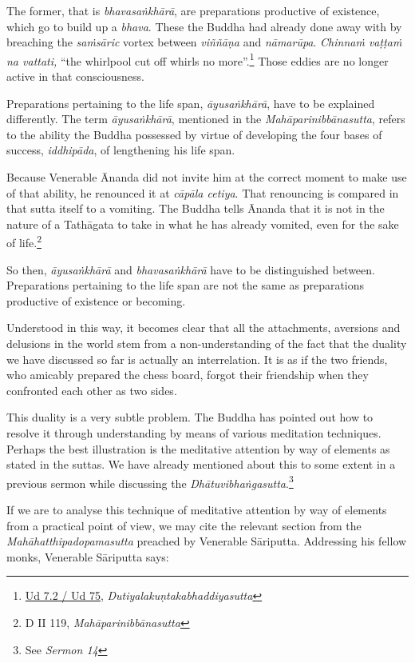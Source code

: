 The former, that is \emph{bhavasaṅkhārā}, are preparations productive of existence, which go to build up a \emph{bhava}. These the Buddha had already done away with by breaching the \emph{saṁsāric} vortex between \emph{viññāṇa} and \emph{nāmarūpa}. \emph{Chinnaṁ vaṭṭaṁ na vattati,} ``the whirlpool cut off whirls no more''.\footnote{\href{https://suttacentral.net/ud7.2/pli/ms}{Ud 7.2 / Ud 75}, \emph{Dutiyalakuṇtakabhaddiyasutta}} Those eddies are no longer active in that consciousness.

Preparations pertaining to the life span, \emph{āyusaṅkhārā}, have to be explained differently. The term \emph{āyusaṅkhārā}, mentioned in the \emph{Mahāparinibbānasutta}, refers to the ability the Buddha possessed by virtue of developing the four bases of success, \emph{iddhipāda}, of lengthening his life span.

Because Venerable Ānanda did not invite him at the correct moment to make use of that ability, he renounced it at \emph{cāpāla cetiya}. That renouncing is compared in that sutta itself to a vomiting. The Buddha tells Ānanda that it is not in the nature of a Tathāgata to take in what he has already vomited, even for the sake of life.\footnote{D II 119, \emph{Mahāparinibbānasutta}}

So then, \emph{āyusaṅkhārā} and \emph{bhavasaṅkhārā} have to be distinguished between. Preparations pertaining to the life span are not the same as preparations productive of existence or becoming.

Understood in this way, it becomes clear that all the attachments, aversions and delusions in the world stem from a non-understanding of the fact that the duality we have discussed so far is actually an interrelation. It is as if the two friends, who amicably prepared the chess board, forgot their friendship when they confronted each other as two sides.

This duality is a very subtle problem. The Buddha has pointed out how to resolve it through understanding by means of various meditation techniques. Perhaps the best illustration is the meditative attention by way of elements as stated in the suttas. We have already mentioned about this to some extent in a previous sermon while discussing the \emph{Dhātuvibhaṅgasutta}.\footnote{See \emph{Sermon 14}}

\clearpage

If we are to analyse this technique of meditative attention by way of elements from a practical point of view, we may cite the relevant section from the \emph{Mahāhatthipadopamasutta} preached by Venerable Sāriputta. Addressing his fellow monks, Venerable Sāriputta says:


